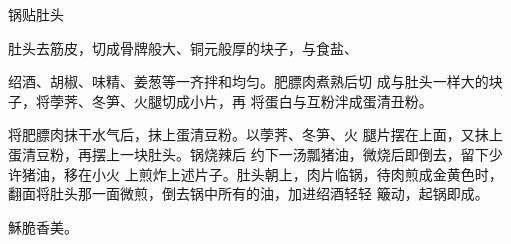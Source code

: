 \begin{recipe}{锅贴肚头}

\ingredients


\cooking

肚头去筋皮，切成骨牌般大、铜元般厚的块子，与食盐、

绍酒、胡椒、味精、姜葱等一齐拌和均匀。肥膘肉煮熟后切 成与肚头一样大的块子，将荸荠、冬笋、火腿切成小片，再 将蛋白与互粉泮成蛋清丑粉。

将肥膘肉抹干水气后，抹上蛋清豆粉。以荸荠、冬笋、火 腿片摆在上面，又抹上蛋清豆粉，再摆上一块肚头。锅烧辣后 约下一汤瓢猪油，微烧后即倒去，留下少许猪油，移在小火 上煎炸上述片子。肚头朝上，肉片临锅，待肉煎成金黄色时， 翻面将肚头那一面微煎，倒去锅中所有的油，加进绍酒轻轻 簸动，起锅即成。

\notes

穌脆香美。

\end{recipe}

